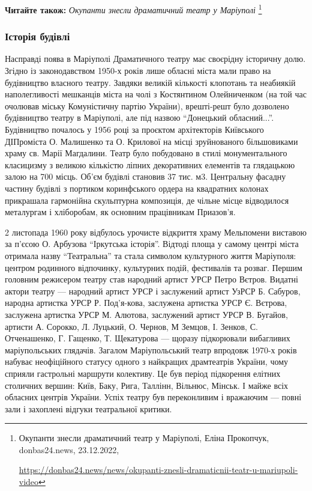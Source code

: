 \textbf{Читайте також:} \emph{Окупанти знесли драматичний театр у Маріуполі}%
\footnote{Окупанти знесли драматичний театр у Маріуполі, Еліна Прокопчук, donbas24.news, 23.12.2022, \par%
\url{https://donbas24.news/news/okupanti-znesli-dramaticnii-teatr-u-mariupoli-video}%
}

\subsubsection{Історія будівлі}

Насправді поява в Маріуполі Драматичного театру має своєрідну історичну долю.
Згідно із законодавством 1950-х років лише обласні міста мали право на
будівництво власного театру. Завдяки великій кількості клопотань та неабиякій
наполегливості мешканців міста на чолі з Костянтином Олейниченком (на той час
очолював міську Комуністичну партію України), врешті-решт було дозволено
будівництво театру в Маріуполі, але під назвою \enquote{Донецький обласний...}.
Будівництво почалось у 1956 році за проєктом архітекторів Київського ДІПроміста
О. Малишенко та О. Крилової на місці зруйнованого більшовиками храму св. Марії
Магдалини. Театр було побудовано в стилі монументального класицизму з великою
кількістю ліпних декоративних елементів та глядацькою залою на 700 місць. Об'єм
будівлі становив 37 тис. м3. Центральну фасадну частину будівлі з портиком
коринфського ордера на квадратних колонах прикрашала гармонійна скульптурна
композиція, де чільне місце відводилося металургам і хліборобам, як основним
працівникам Приазов'я.


2 листопада 1960 року відбулось урочисте відкриття храму Мельпомени виставою за
п'єсою О. Арбузова \enquote{Іркутська історія}. Відтоді площа у самому центрі міста
отримала назву \enquote{Театральна} та стала символом культурного життя Маріуполя:
центром родинного відпочинку, культурних подій, фестивалів та розваг. Першим
головним режисером театру став народний артист УРСР Петро Вєтров. Видатні
актори театру — народний артист УРСР і заслужений артист УзРСР Б. Сабуров,
народна артистка УРСР Р. Под'я\hyp{}кова, заслужена артистка УРСР Є. Вєтрова,
заслужена артистка УРСР М. Алютова, заслужений артист УРСР В. Бугайов, артисти
А. Сорокко, Л. Луцький, О. Чернов, М Земцов, І. Зенков, С. Отченашенко, Г.
Гащенко, Т. Щекатурова — щоразу підкорювали вибагливих маріупольських глядачів.
Загалом Маріупольський театр впродовж 1970-х років набуває неофіційного статусу
одного з найкращих драмтеатрів України, чому сприяли гастрольні маршрути
колективу. Це був період підкорення елітних столичних вершин: Київ, Баку, Рига,
Таллінн, Вільнюс, Мінськ. І майже всіх обласних центрів України. Успіх театру
був переконливим і вражаючим — повні зали і захоплені відгуки театральної
критики.

